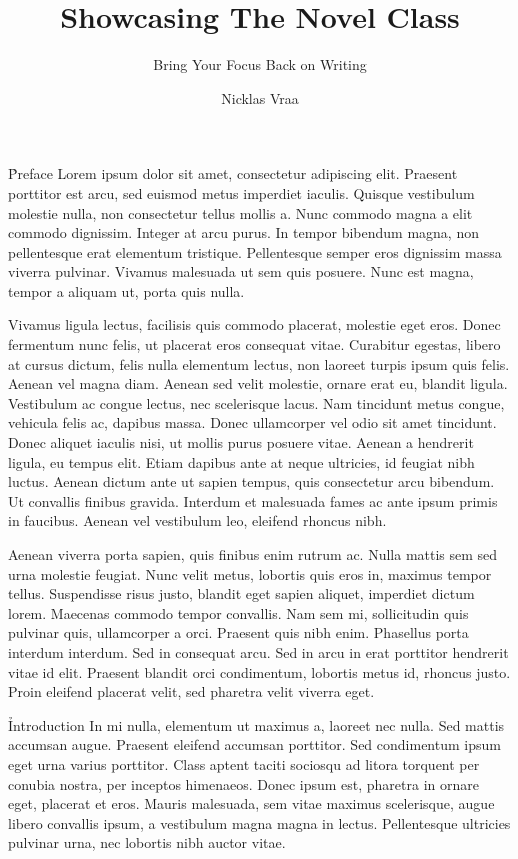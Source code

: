 \documentclass{novel}
\title     {Showcasing The Novel Class}
\subtitle  {Bring Your Focus Back on Writing}
\author    {Nicklas Vraa}
\begin{document}
\h*{Preface}
Lorem ipsum dolor sit amet, consectetur adipiscing elit. Praesent porttitor est arcu, sed euismod metus imperdiet iaculis. Quisque vestibulum molestie nulla, non consectetur tellus mollis a. Nunc commodo magna a elit commodo dignissim. Integer at arcu purus. In tempor bibendum magna, non pellentesque erat elementum tristique. Pellentesque semper eros dignissim massa viverra pulvinar. Vivamus malesuada ut sem quis posuere. Nunc est magna, tempor a aliquam ut, porta quis nulla.

Vivamus ligula lectus, facilisis quis commodo placerat, molestie eget eros. Donec fermentum nunc felis, ut placerat eros consequat vitae. Curabitur egestas, libero at cursus dictum, felis nulla elementum lectus, non laoreet turpis ipsum quis felis. Aenean vel magna diam. Aenean sed velit molestie, ornare erat eu, blandit ligula. Vestibulum ac congue lectus, nec scelerisque lacus. Nam tincidunt metus congue, vehicula felis ac, dapibus massa. Donec ullamcorper vel odio sit amet tincidunt. Donec aliquet iaculis nisi, ut mollis purus posuere vitae. Aenean a hendrerit ligula, eu tempus elit. Etiam dapibus ante at neque ultricies, id feugiat nibh luctus. Aenean dictum ante ut sapien tempus, quis consectetur arcu bibendum. Ut convallis finibus gravida. Interdum et malesuada fames ac ante ipsum primis in faucibus. Aenean vel vestibulum leo, eleifend rhoncus nibh.

Aenean viverra porta sapien, quis finibus enim rutrum ac. Nulla mattis sem sed urna molestie feugiat. Nunc velit metus, lobortis quis eros in, maximus tempor tellus. Suspendisse risus justo, blandit eget sapien aliquet, imperdiet dictum lorem. Maecenas commodo tempor convallis. Nam sem mi, sollicitudin quis pulvinar quis, ullamcorper a orci. Praesent quis nibh enim. Phasellus porta interdum interdum. Sed in consequat arcu. Sed in arcu in erat porttitor hendrerit vitae id elit. Praesent blandit orci condimentum, lobortis metus id, rhoncus justo. Proin eleifend placerat velit, sed pharetra velit viverra eget.

\h{Introduction}
In mi nulla, elementum ut maximus a, laoreet nec nulla. Sed mattis accumsan augue. Praesent eleifend accumsan porttitor. Sed condimentum ipsum eget urna varius porttitor. Class aptent taciti sociosqu ad litora torquent per conubia nostra, per inceptos himenaeos. Donec ipsum est, pharetra in ornare eget, placerat et eros. Mauris malesuada, sem vitae maximus scelerisque, augue libero convallis ipsum, a vestibulum magna magna in lectus. Pellentesque ultricies pulvinar urna, nec lobortis nibh auctor vitae.
\end{document}

